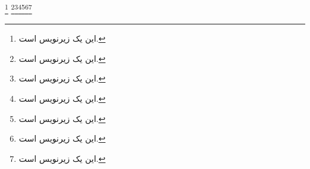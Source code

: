\documentclass{article}
\begin{document}
\footnote{این یک زیرنویس است.}
\newpage
\RTLcolumnfootnotes
\footnote{این یک زیرنویس است.}\footnote{این یک زیرنویس است.}\footnote{این یک زیرنویس است.}\footnote{این یک زیرنویس است.}\footnote{این یک زیرنویس است.}\footnote{این یک زیرنویس است.}
\end{document}
